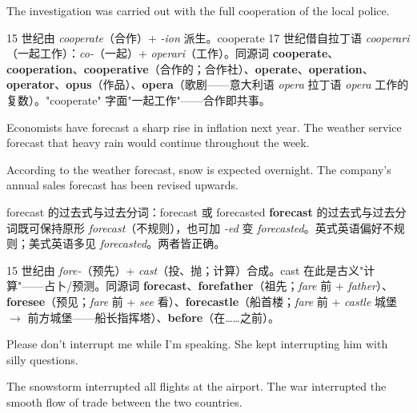 \documentclass[../main.tex]{subfiles}
\begin{document}
{The investigation was carried out with the full cooperation of the local police.}

\begin{origin}
15 世纪由 \textit{cooperate}（合作）+ \textit{-ion} 派生。cooperate 17 世纪借自拉丁语 \textit{cooperari}（一起工作）：\textit{co-}（一起）+ \textit{operari}（工作）。同源词 \textbf{cooperate}、\textbf{cooperation}、\textbf{cooperative}（合作的；合作社）、\textbf{operate}、\textbf{operation}、\textbf{operator}、\textbf{opus}（作品）、\textbf{opera}（歌剧——意大利语 \textit{opera} 拉丁语 \textit{opera} 工作的复数）。"cooperate" 字面"一起工作"——合作即共事。
\end{origin}


{Economists have forecast a sharp rise in inflation next year.}
{The weather service forecast that heavy rain would continue throughout the week.}

{According to the weather forecast, snow is expected overnight.}
{The company's annual sales forecast has been revised upwards.}

\begin{gram}{forecast 的过去式与过去分词：forecast 或 forecasted}
\textbf{forecast} 的过去式与过去分词既可保持原形 \textit{forecast}（不规则），也可加 \textit{-ed} 变 \textit{forecasted}。英式英语偏好不规则；美式英语多见 \textit{forecasted}。两者皆正确。
\end{gram}

\begin{origin}
15 世纪由 \textit{fore-}（预先）+ \textit{cast}（投、抛；计算）合成。cast 在此是古义"计算"——占卜/预测。同源词 \textbf{forecast}、\textbf{forefather}（祖先；\textit{fare} 前 + \textit{father}）、\textbf{foresee}（预见；\textit{fare} 前 + \textit{see} 看）、\textbf{forecastle}（船首楼；\textit{fare} 前 + \textit{castle} 城堡$\to$ 前方城堡——船长指挥塔）、\textbf{before}（在……之前）。
\end{origin}


{Please don't interrupt me while I'm speaking.}
{She kept interrupting him with silly questions.}

{The snowstorm interrupted all flights at the airport.}
{The war interrupted the smooth flow of trade between the two countries.}
\end{document}
